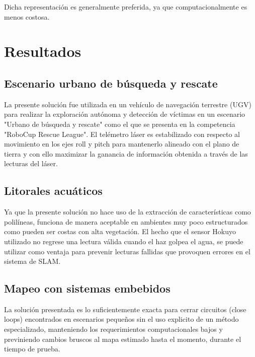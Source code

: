 \documentclass[10pt,a4paper]{article}
\begin{document}
Dicha representación es generalmente preferida, ya que computacionalmente es menos costosa.

\section{Resultados}

\subsection{Escenario urbano de búsqueda y rescate}

La presente solución fue utilizada en un vehículo de navegación terrestre (UGV) para realizar la exploración autónoma y detección de víctimas en un escenario "Urbano de búsqueda y rescate" como el que se presenta en la competencia "RoboCup Rescue League". El telémetro láser es estabilizado con respecto al movimiento en los ejes roll y pitch para mantenerlo alineado con el plano de tierra y con ello maximizar la ganancia de información obtenida a través de las lecturas del láser.

\subsection{Litorales acuáticos}

Ya que la presente solución no hace uso de la extracción de características como polilíneas, funciona de manera aceptable en ambientes muy poco estructurados como pueden ser costas con alta vegetación. El hecho que el sensor Hokuyo utilizado no regrese una lectura válida cuando el haz golpea el agua, se puede utilizar como ventaja para prevenir lecturas fallidas que provoquen errores en el sistema de SLAM.

\subsection{Mapeo con sistemas embebidos}

La solución presentada es lo suficientemente exacta para cerrar circuitos (close loops) encontrados en escenarios pequeños sin el uso explicito de un método especializado, manteniendo los requerimientos computacionales bajos y previniendo cambios bruscos al mapa estimado hasta el momento, durante el tiempo de prueba.

\end{document}
